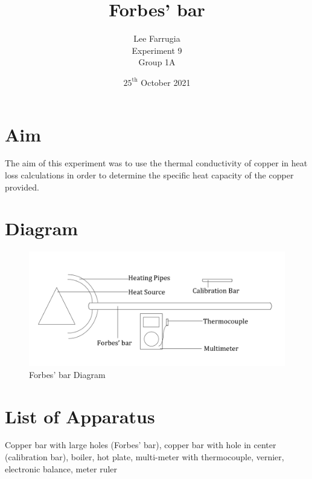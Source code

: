 \documentclass[12pt, a4paper]{article}
\title{Forbes' bar}
\author{Lee Farrugia \\ Experiment 9 \\ Group 1A}
\date{$25^{\text{th}}$ October 2021}
\begin{document}
\maketitle

\section*{Aim}
The aim of this experiment was to use the thermal conductivity of copper in heat loss calculations in order to determine the specific heat capacity of the copper provided.

\section*{Diagram}
\begin{figure}[ht]
    \centering
    \includegraphics[width=\textwidth]{Experiment 9 Diagram.png}
    \caption{Forbes' bar Diagram}
    \label{fig:Apparatus diagram}
\end{figure}

\section*{List of Apparatus}

Copper bar with large holes (Forbes' bar), copper bar with hole in center (calibration bar), boiler, hot plate, multi-meter with thermocouple, vernier, electronic balance, meter ruler
\end{document}
